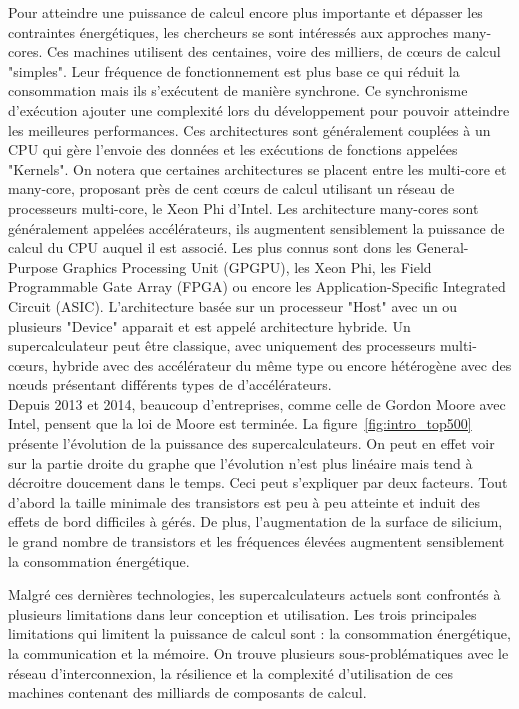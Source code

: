 \documentclass[12pt,a4paper]{report}
\begin{document}
Pour atteindre une puissance de calcul encore plus importante et dépasser les contraintes énergétiques, les chercheurs se sont intéressés aux approches many-cores. 
Ces machines utilisent des centaines, voire des milliers, de cœurs de calcul "simples".
Leur fréquence de fonctionnement est plus base ce qui réduit la consommation mais ils s'exécutent de manière synchrone. 
Ce synchronisme d'exécution ajouter une complexité lors du développement pour pouvoir atteindre les meilleures performances.
Ces architectures sont généralement couplées à un CPU qui gère l'envoie des données et les exécutions de fonctions appelées "Kernels".
On notera que certaines architectures se placent entre les multi-core et many-core, proposant près de cent cœurs de calcul utilisant un réseau de processeurs multi-core, le Xeon Phi d'Intel.
Les architecture many-cores sont généralement appelées accélérateurs, ils augmentent sensiblement la puissance de calcul du CPU auquel il est associé. 
Les plus connus sont dons les General-Purpose Graphics Processing Unit (GPGPU), les Xeon Phi, les Field Programmable Gate Array (FPGA) ou encore les Application-Specific Integrated Circuit (ASIC).
L'architecture basée sur un processeur "Host" avec un ou plusieurs "Device" apparait et est appelé architecture hybride. 
Un supercalculateur peut être classique, avec uniquement des processeurs multi-cœurs, hybride avec des accélérateur du même type ou encore hétérogène avec des nœuds présentant différents types de d'accélérateurs. \\

Depuis 2013 et 2014, beaucoup d'entreprises, comme celle de Gordon Moore avec Intel, pensent que la loi de Moore est terminée. 
La figure~\ref{fig:intro_top500} présente l'évolution de la puissance des supercalculateurs. 
On peut en effet voir sur la partie droite du graphe que l'évolution n'est plus linéaire mais tend à décroitre doucement dans le temps. 
Ceci peut s'expliquer par deux facteurs. 
Tout d'abord la taille minimale des transistors est peu à peu atteinte et induit des effets de bord difficiles à gérés. 
De plus, l'augmentation de la surface de silicium, le grand nombre de transistors et les fréquences élevées augmentent sensiblement la consommation énergétique. 

Malgré ces dernières technologies, les supercalculateurs actuels sont confrontés à plusieurs limitations dans leur conception et utilisation.
Les trois principales limitations qui limitent la puissance de calcul sont : la consommation énergétique, la communication et la mémoire. 
On trouve plusieurs sous-problématiques avec le réseau d'interconnexion, la résilience et la complexité d'utilisation de ces machines contenant des milliards de composants de calcul.\\
\end{document}
